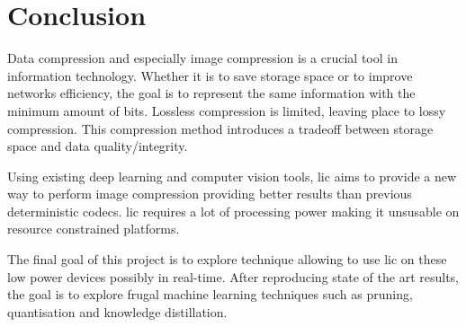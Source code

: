 \chapter*{Conclusion}
Data compression and especially image compression is a crucial tool in information technology. Whether it is to save storage space or to improve networks efficiency, the goal is to represent the same information with the minimum amount of bits. Lossless compression is limited, leaving place to lossy compression. This compression method introduces a tradeoff between storage space and data quality/integrity.

Using existing deep learning and computer vision tools, \acrfull{lic} aims to provide a new way to perform image compression providing better results than previous deterministic codecs. \acrshort{lic} requires a lot of processing power making it unsusable on resource constrained platforms.

The final goal of this project is to explore technique allowing to use \acrshort{lic} on these low power devices possibly in real-time. After reproducing state of the art results, the goal is to explore frugal machine learning techniques such as pruning, quantisation and knowledge distillation.
